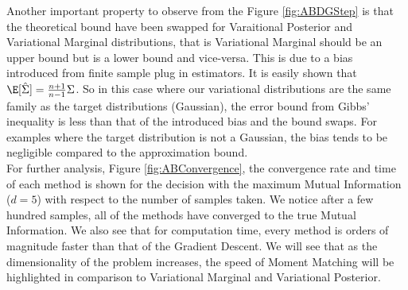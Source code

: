     Another important property to observe from the Figure \ref{fig:ABDGStep} is 
    that the theoretical bound have been swapped for Varaitional Posterior and 
    Variational Marginal distributions, that is Variational Marginal should be 
    an upper bound but is a lower bound and vice-versa. This is due to a bias 
    introduced from finite sample plug in estimators. It is easily shown 
    that $\E[\hat{\Sigma}]=\frac{n+1}{n-1}\Sigma$. So in this case where our 
    variational distributions are the same family as the target distributions 
    (Gaussian), the error bound from Gibbs' inequality is less than that of the 
    introduced bias and the bound swaps. For examples where the target distribution 
    is not a Gaussian, the bias tends to be negligible compared to the approximation 
    bound.\\
    
    For further analysis, Figure \ref{fig:ABConvergence}, the convergence rate and 
    time of each method is shown for the decision with the maximum Mutual 
    Information ($d=5$) with respect to the number of samples taken. We notice after 
    a few hundred samples, all of the methods have converged to the true Mutual 
    Information. We also see that for computation time, every method is orders of 
    magnitude faster than that of the Gradient Descent. We will see that as the 
    dimensionality of the problem increases, the speed of Moment Matching will be 
    highlighted in comparison to Variational Marginal and Variational Posterior.
    
    \begin{figure*}[!htb]
    \centering
    \caption{\textbf{A/B Test Mutual Information Estimation} for $11$ decisions of assigning $10$ participants to $2$ groups. Because the method is Gaussian linear, each model converges to the true Mutual Information. (a) The convergence of MI with respect to the number of samples drawn is plotted for the maximum MI decision ($d=5$) (b) The run time of each method is plotted for the number of samples for the maximum MI decision ($d=5$). Note that Moment Matching and Gradient Descent Match in approximation Value however Moment matching save orders of magnitude in computation time. }
    \label{fig:ABConvergence}
    \end{figure*}